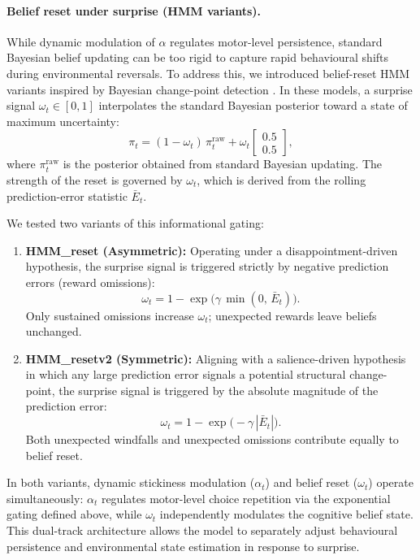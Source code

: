 \documentclass[11pt, reprint, aps, prl]{revtex4-2}
\begin{document}
\paragraph{\textbf{Belief reset under surprise (HMM variants).}}
While dynamic modulation of $\alpha$ regulates motor-level persistence, standard Bayesian belief updating can be too rigid to capture rapid behavioural shifts during environmental reversals. To address this, we introduced belief-reset HMM variants inspired by Bayesian change-point detection \cite{Adams2007,Nassar2010}. In these models, a surprise signal $\omega_t\in[0,1]$ interpolates the standard Bayesian posterior toward a state of maximum uncertainty:
\begin{equation}
\pi_t = (1-\omega_t)\,\pi^{\text{raw}}_t + \omega_t
\begin{bmatrix} 0.5 \\ 0.5 \end{bmatrix},
\end{equation}
where $\pi^{\text{raw}}_t$ is the posterior obtained from standard Bayesian updating. The strength of the reset is governed by $\omega_t$, which is derived from the rolling prediction-error statistic $\bar{E}_t$.

We tested two variants of this informational gating:
\begin{enumerate}
\item \textbf{HMM\_reset (Asymmetric):} Operating under a disappointment-driven hypothesis, the surprise signal is triggered strictly by negative prediction errors (reward omissions):
\begin{equation}
\omega_t = 1 - \exp\!\bigl(\gamma\,\min(0,\,\bar{E}_t)\bigr).
\end{equation}
Only sustained omissions increase $\omega_t$; unexpected rewards leave beliefs unchanged.
\item \textbf{HMM\_resetv2 (Symmetric):} Aligning with a salience-driven hypothesis in which any large prediction error signals a potential structural change-point, the surprise signal is triggered by the absolute magnitude of the prediction error:
\begin{equation}
\omega_t = 1 - \exp\!\bigl(-\gamma\,|\bar{E}_t|\bigr).
\end{equation}
Both unexpected windfalls and unexpected omissions contribute equally to belief reset.
\end{enumerate}
In both variants, dynamic stickiness modulation ($\alpha_t$) and belief reset ($\omega_t$) operate simultaneously: $\alpha_t$ regulates motor-level choice repetition via the exponential gating defined above, while $\omega_t$ independently modulates the cognitive belief state. This dual-track architecture allows the model to separately adjust behavioural persistence and environmental state estimation in response to surprise.
\end{document}
